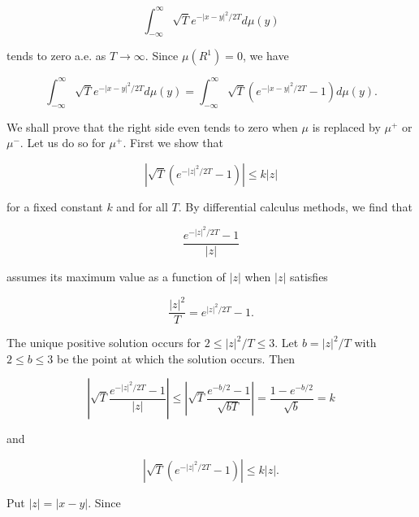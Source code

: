 $$\int_{-\infty}^{\infty} \sqrt{T} e^{-|x-y|^2/2T} d\mu(y)$$

tends to zero a.e. as $T \to \infty$. Since $\mu(R^1) = 0$, we have

$$\int_{-\infty}^{\infty} \sqrt{T} e^{-|x-y|^2/2T} d\mu(y) = \int_{-\infty}^{\infty} \sqrt{T} (e^{-|x-y|^2/2T} - 1) d\mu(y).$$

We shall prove that the right side even tends to zero when $\mu$ is replaced by $\mu^+$ or $\mu^-$. Let us do so for $\mu^+$. First we show that

$$|\sqrt{T}(e^{-|z|^2/2T} - 1)| \leq k|z|$$

for a fixed constant $k$ and for all $T$. By differential calculus methods, we find that

$$\frac{e^{-|z|^2/2T} - 1}{|z|}$$

assumes its maximum value as a function of $|z|$ when $|z|$ satisfies

$$\frac{|z|^2}{T} = e^{|z|^2/2T} - 1.$$

The unique positive solution occurs for $2 \leq |z|^2/T \leq 3$. Let $b = |z|^2/T$ with $2 \leq b \leq 3$ be the point at which the solution occurs. Then

$$\left| \sqrt{T} \frac{e^{-|z|^2/2T} - 1}{|z|} \right| \leq \left| \sqrt{T} \frac{e^{-b/2} - 1}{\sqrt{bT}} \right| = \frac{1 - e^{-b/2}}{\sqrt{b}} = k$$

and

$$|\sqrt{T}(e^{-|z|^2/2T} - 1)| \leq k|z|.$$

Put $|z| = |x-y|$. Since
